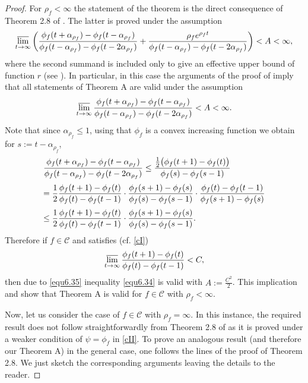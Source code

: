 \documentclass[11pt, oneside]{amsart}
\begin{document}
\begin{proof}
For $\rho_f<\infty$ the statement of the theorem is the direct consequence of Theorem 2.8 of \cite{B}.  The latter is proved under the assumption
\begin{equation}\label{equ6.33}
\varlimsup_{t\rightarrow\infty}\left(\frac{\phi_f(t+\alpha_{\rho_f})-\phi_f(t-\alpha_{\rho_f})}{\phi_f(t-\alpha_{\rho_f})-\phi_f(t-2\alpha_{\rho_f})}+\frac{\rho_fe^{\rho_f t}}{\phi_f(t-\alpha_{\rho_f})-\phi_f(t-2\alpha_{\rho_f})}\right)<A<\infty,
\end{equation}
where the second summand is included only to give an effective upper bound of function $r$
(see \cite[Eq.\,(9.6)]{B}). In particular, in this case the arguments of the proof of \cite[Th.\,2.8]{B} imply that all statements of Theorem A are valid under the assumption
\begin{equation}\label{equ6.34}
\varlimsup_{t\rightarrow\infty}\frac{\phi_f(t+\alpha_{\rho_f})-\phi_f(t-\alpha_{\rho_f})}{\phi_f(t-\alpha_{\rho_f})-\phi_f(t-2\alpha_{\rho_f})}<A<\infty.
\end{equation}
Note that since $\alpha_{\rho_f}\le 1$, using that $\phi_f$ is a convex increasing function we obtain for $s:=t-\alpha_{\rho_f}$,
\begin{equation}\label{equ6.35}
\begin{array}{l}
\displaystyle
\frac{\phi_f(t+\alpha_{\rho_f})-\phi_f(t-\alpha_{\rho_f})}{\phi_f(t-\alpha_{\rho_f})-\phi_f(t-2\alpha_{\rho_f})}\le
\frac{\frac 12 \big(\phi_f(t+1)-\phi_f(t)\bigr)}{\phi_f(s)-\phi_f(s-1)}\medskip\\
\displaystyle = \frac{1}{2}\frac{\phi_f(t+1)-\phi_f(t)}{\phi_f(t)-\phi_f(t-1)}\cdot\frac{\phi_f(s+1)-\phi_f(s)}{\phi_f(s)-\phi_f(s-1)}\cdot\frac{\phi_f(t)-\phi_f(t-1)}{\phi_f(s+1)-\phi_f(s)}\medskip\\
\displaystyle \le \frac{1}{2}\frac{\phi_f(t+1)-\phi_f(t)}{\phi_f(t)-\phi_f(t-1)}\cdot\frac{\phi_f(s+1)-\phi_f(s)}{\phi_f(s)-\phi_f(s-1)}.
\end{array}
\end{equation}
Therefore if $f\in\mathscr C$ and satisfies (cf. \eqref{cI})
\[
\varlimsup_{t\rightarrow\infty}\frac{\phi_f(t+1)-\phi_f(t)}{\phi_f(t)-\phi_f(t-1)}<C,
\]
then due to \eqref{equ6.35} inequality \eqref{equ6.34} is valid with $A:=\frac{C^2}{2}$. This implication and \cite[Th.\,2.8]{B} show that Theorem A is valid for $f\in\mathscr C$ with $\rho_f<\infty$.\smallskip

Now, let us consider the case of $f\in\mathscr C$ with $\rho_f=\infty$. In this instance, the required result does not follow straightforwardly  from Theorem 2.8 of \cite{B} as it is proved under a weaker condition of $\psi=\phi_f$ in \eqref{cII}. 
To prove an analogous result (and therefore our Theorem A) in the general case, one follows the lines of the proof of Theorem 2.8. We just sketch the corresponding arguments leaving the details to the reader.


\end{proof}
\end{document}
